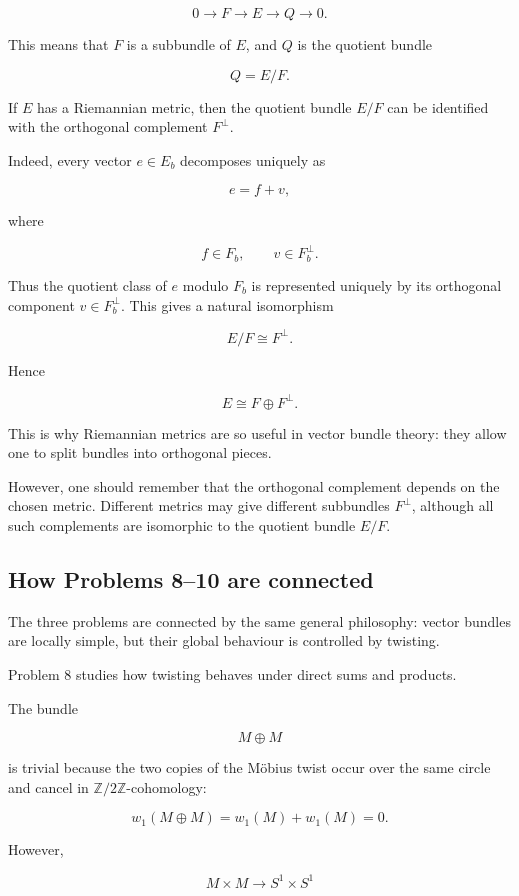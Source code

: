 \documentclass[12pt,a4paper]{article}
\newcommand{\Ztwo}{\mathbb{Z}/2\mathbb{Z}}
\theoremstyle{notespace}
\begin{document}
	\[
	0\to F\to E\to Q\to 0.
	\]
	
	This means that \(F\) is a subbundle of \(E\), and \(Q\) is the quotient bundle
	
	\[
	Q=E/F.
	\]
	
	If \(E\) has a Riemannian metric, then the quotient bundle \(E/F\) can be identified with the orthogonal complement \(F^{\perp}\).
	
	Indeed, every vector \(e\in E_b\) decomposes uniquely as
	
	\[
	e=f+v,
	\]
	
	where
	
	\[
	f\in F_b,
	\qquad
	v\in F_b^{\perp}.
	\]
	
	Thus the quotient class of \(e\) modulo \(F_b\) is represented uniquely by its orthogonal component \(v\in F_b^{\perp}\). This gives a natural isomorphism
	
	\[
	E/F\cong F^{\perp}.
	\]
	
	Hence
	
	\[
	E\cong F\oplus F^{\perp}.
	\]
	
	This is why Riemannian metrics are so useful in vector bundle theory: they allow one to split bundles into orthogonal pieces.
	
	However, one should remember that the orthogonal complement depends on the chosen metric. Different metrics may give different subbundles \(F^{\perp}\), although all such complements are isomorphic to the quotient bundle \(E/F\).
	
	\subsection{How Problems 8--10 are connected}
	
	The three problems are connected by the same general philosophy: vector bundles are locally simple, but their global behaviour is controlled by twisting.
	
	Problem 8 studies how twisting behaves under direct sums and products.
	
	The bundle
	
	\[
	M\oplus M
	\]
	
	is trivial because the two copies of the M\"obius twist occur over the same circle and cancel in \(\Ztwo\)-cohomology:
	
	\[
	w_1(M\oplus M)=w_1(M)+w_1(M)=0.
	\]
	
	However,
	
	\[
	M\times M\to S^{1}\times S^{1}
	\]
	
\end{document}
